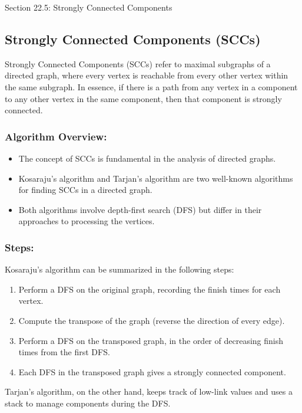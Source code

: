 \begin{notes}{Section 22.5: Strongly Connected Components}
    \subsection*{Strongly Connected Components (SCCs)}

    Strongly Connected Components (SCCs) refer to maximal subgraphs of a directed graph, where every vertex is reachable from every other vertex within the same subgraph. In essence, if there is a 
    path from any vertex in a component to any other vertex in the same component, then that component is strongly connected. \vspace*{1em}
    
    \subsubsection*{Algorithm Overview:}

    \begin{itemize}
        \item The concept of SCCs is fundamental in the analysis of directed graphs.
        \item Kosaraju's algorithm and Tarjan's algorithm are two well-known algorithms for finding SCCs in a directed graph.
        \item Both algorithms involve depth-first search (DFS) but differ in their approaches to processing the vertices.
    \end{itemize}
    
    \subsubsection*{Steps:}

    Kosaraju's algorithm can be summarized in the following steps:
    \begin{enumerate}
        \item Perform a DFS on the original graph, recording the finish times for each vertex.
        \item Compute the transpose of the graph (reverse the direction of every edge).
        \item Perform a DFS on the transposed graph, in the order of decreasing finish times from the first DFS.
        \item Each DFS in the transposed graph gives a strongly connected component.
    \end{enumerate}
    Tarjan's algorithm, on the other hand, keeps track of low-link values and uses a stack to manage components during the DFS.
    

\end{notes}
